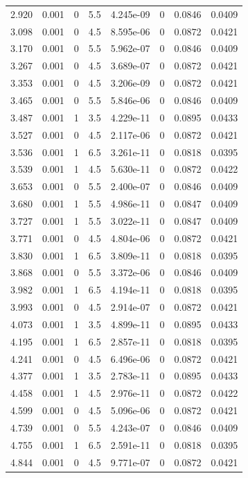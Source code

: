 \documentclass[preview]{standalone}
\begin{document}
{{\begin{tabular}{L{1.2cm}C{1.2cm} C{0.3cm}C{0.5cm} C{1.4cm}C{1.4cm} C{1.4cm}C{1.4cm}}
  2.920  &  0.001  & 0     & 5.5 &  4.245e-09  & 0  & 0.0846 &  0.0409   \\ 
  3.098  &  0.001  & 0     & 4.5 &  8.595e-06  & 0  & 0.0872 &  0.0421   \\ 
  3.170  &  0.001  & 0     & 5.5 &  5.962e-07  & 0  & 0.0846 &  0.0409   \\ 
  3.267  &  0.001  & 0     & 4.5 &  3.689e-07  & 0  & 0.0872 &  0.0421   \\ 
  3.353  &  0.001  & 0     & 4.5 &  3.206e-09  & 0  & 0.0872 &  0.0421   \\ 
  3.465  &  0.001  & 0     & 5.5 &  5.846e-06  & 0  & 0.0846 &  0.0409   \\ 
  3.487  &  0.001  & 1     & 3.5 &  4.229e-11  & 0  & 0.0895 &  0.0433   \\ 
  3.527  &  0.001  & 0     & 4.5 &  2.117e-06  & 0  & 0.0872 &  0.0421   \\ 
  3.536  &  0.001  & 1     & 6.5 &  3.261e-11  & 0  & 0.0818 &  0.0395   \\ 
  3.539  &  0.001  & 1     & 4.5 &  5.630e-11  & 0  & 0.0872 &  0.0422   \\ 
  3.653  &  0.001  & 0     & 5.5 &  2.400e-07  & 0  & 0.0846 &  0.0409   \\ 
  3.680  &  0.001  & 1     & 5.5 &  4.986e-11  & 0  & 0.0847 &  0.0409   \\ 
  3.727  &  0.001  & 1     & 5.5 &  3.022e-11  & 0  & 0.0847 &  0.0409   \\ 
  3.771  &  0.001  & 0     & 4.5 &  4.804e-06  & 0  & 0.0872 &  0.0421   \\ 
  3.830  &  0.001  & 1     & 6.5 &  3.809e-11  & 0  & 0.0818 &  0.0395   \\ 
  3.868  &  0.001  & 0     & 5.5 &  3.372e-06  & 0  & 0.0846 &  0.0409   \\ 
  3.982  &  0.001  & 1     & 6.5 &  4.194e-11  & 0  & 0.0818 &  0.0395   \\ 
  3.993  &  0.001  & 0     & 4.5 &  2.914e-07  & 0  & 0.0872 &  0.0421   \\ 
  4.073  &  0.001  & 1     & 3.5 &  4.899e-11  & 0  & 0.0895 &  0.0433   \\ 
  4.195  &  0.001  & 1     & 6.5 &  2.857e-11  & 0  & 0.0818 &  0.0395   \\ 
  4.241  &  0.001  & 0     & 4.5 &  6.496e-06  & 0  & 0.0872 &  0.0421   \\ 
  4.377  &  0.001  & 1     & 3.5 &  2.783e-11  & 0  & 0.0895 &  0.0433   \\ 
  4.458  &  0.001  & 1     & 4.5 &  2.976e-11  & 0  & 0.0872 &  0.0422   \\ 
  4.599  &  0.001  & 0     & 4.5 &  5.096e-06  & 0  & 0.0872 &  0.0421   \\ 
  4.739  &  0.001  & 0     & 5.5 &  4.243e-07  & 0  & 0.0846 &  0.0409   \\ 
  4.755  &  0.001  & 1     & 6.5 &  2.591e-11  & 0  & 0.0818 &  0.0395   \\ 
  4.844  &  0.001  & 0     & 4.5 &  9.771e-07  & 0  & 0.0872 &  0.0421   \\ 
\hline 
\end{tabular} 

}}
\end{document}
